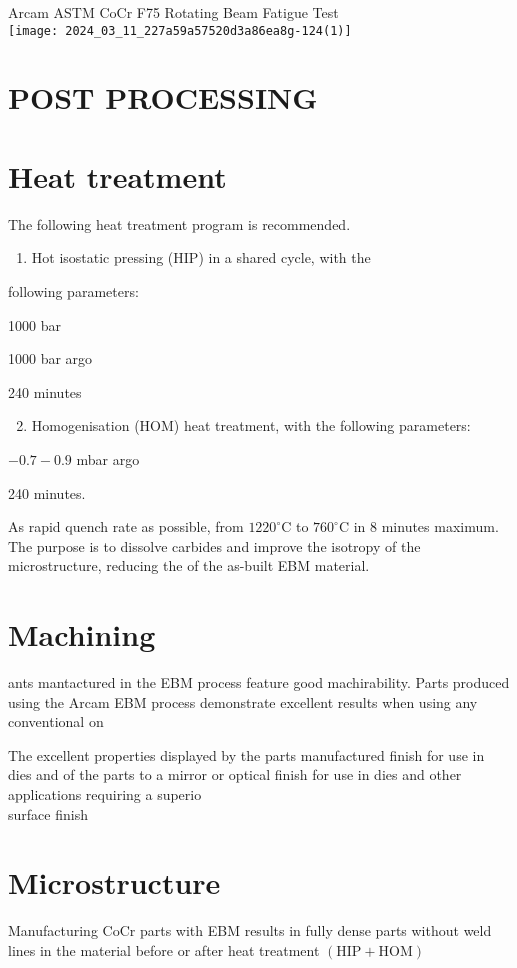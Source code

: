 \documentclass[10pt]{article}
\begin{document}
Arcam ASTM CoCr F75 Rotating Beam Fatigue Test\\
\texttt{[image: 2024\_03\_11\_227a59a57520d3a86ea8g-124(1)]}

\section*{POST PROCESSING}
\section*{Heat treatment}
The following heat treatment program is recommended.

\begin{enumerate}
  \item Hot isostatic pressing (HIP) in a shared cycle, with the
\end{enumerate}

following parameters:

1000 bar

1000 bar argo

240 minutes

\begin{enumerate}
  \setcounter{enumi}{1}
  \item Homogenisation (HOM) heat treatment, with the following parameters:
\end{enumerate}

$-0.7-0.9$ mbar argo

240 minutes.

As rapid quench rate as possible, from $1220^{\circ} \mathrm{C}$ to $760^{\circ} \mathrm{C}$ in 8 minutes maximum. The purpose is to dissolve carbides and improve the isotropy of the microstructure, reducing the of the as-built EBM material.

\section*{Machining}
ants mantactured in the EBM process feature good machirability. Parts produced using the Arcam EBM process demonstrate excellent results when using any conventional on

The excellent properties displayed by the parts manufactured finish for use in dies and of the parts to a mirror or optical finish for use in dies and other applications requiring a superio\\
surface finish

\section*{Microstructure}
Manufacturing CoCr parts with EBM results in fully dense parts without weld lines in the material before or after heat treatment $(\mathrm{HIP}+\mathrm{HOM})$
\end{document}
